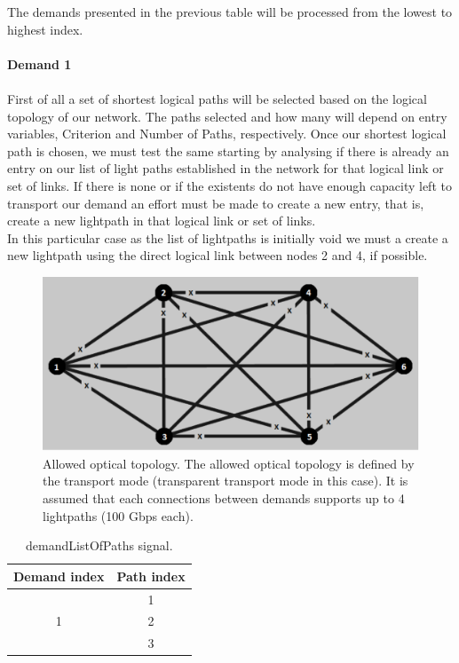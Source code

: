 The demands presented in the previous table will be processed from the lowest to highest index.
\\ \\
\textbf{Demand 1}\\ \\

First of all a set of shortest logical paths will be selected based on the logical topology of our network. The paths selected and how many will depend on entry variables, Criterion and Number of Paths, respectively.
Once our shortest logical path is chosen, we must test the same starting by analysing if there is already an entry on our list of light paths established in the network for that logical link or set of links. If there is none or if the existents do not have enough capacity left to transport our demand an effort must be made to create a new entry, that is, create a new lightpath in that logical link or set of links. \\
In this particular case as the list of lightpaths is initially void we must a create a new lightpath using the direct logical link between nodes 2 and 4, if possible.

\begin{figure}[H]
	\centering
	\includegraphics[width=13cm]{sdf/heuristic/transparent/figures/allowed_optical}
	\caption{Allowed optical topology. The allowed optical topology is defined by the transport mode (transparent transport mode in this case). It is assumed that each connections between demands supports up to 4 lightpaths (100 Gbps each).}
	\label{allowed_optical_surv_ref_high_heuristic_transparent}
\end{figure}

\begin{table}[H]
	\centering
	\begin{tabular}{|c|c|l|l|}
		\hline
		Demand index           & \multicolumn{3}{c|}{Path index} \\ \hline
		\multirow{3}{*}{1} & \multicolumn{3}{c|}{1}          \\ \cline{2-4}
		& \multicolumn{3}{c|}{2}        \\ \cline{2-4}
		& \multicolumn{3}{c|}{3}        \\ \hline
	\end{tabular}
	\caption{demandListOfPaths signal.}
	\label{demandListOfPaths_example}
\end{table}

